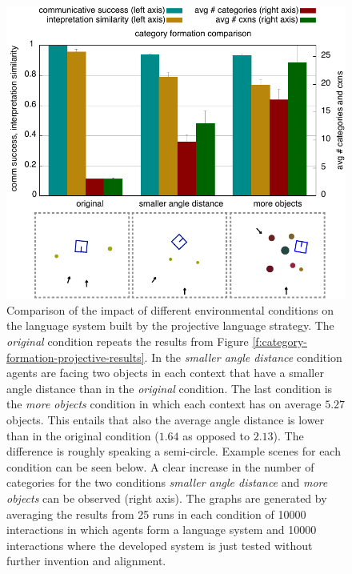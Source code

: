 \begin{figure}
\begin{center}
\includegraphics[width=1.0\columnwidth]{figs/category-formation-projective-compare-original-smaller-angle-more-objects}
\end{center}
\caption[Impact of different environmental conditions on 
projective systems]{
Comparison of the impact of different environmental conditions on the language
system built by the projective language strategy. The \emph{original} condition repeats the results 
from Figure \ref{f:category-formation-projective-results}. In the \emph{smaller angle distance} condition
agents are facing two objects in each context that have a smaller angle distance than in the
\emph{original} condition. The last condition is the \emph{more objects} condition in which each context has 
on average $5.27$ objects. This entails that also the average angle distance is lower than in the original condition 
($1.64$ as opposed to $2.13$). The difference is roughly speaking a semi-circle.
Example scenes for each condition can be seen below.
A clear increase in the number of categories for the two conditions \emph{smaller angle distance} and 
\emph{more objects} can be observed (right axis). The graphs are generated by averaging the results 
from 25 runs in each condition of 10000 interactions in which agents form a language system and 10000
interactions where the developed system is just tested without further invention and alignment.}
\label{f:compare-original-smaller-angle-more-objects}
\end{figure}


